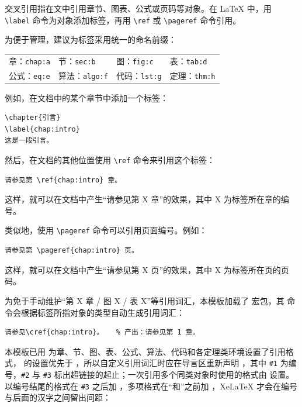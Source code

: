 交叉引用指在文中引用章节、图表、公式或页码等对象。在 \LaTeX{} 中，用 \verb|\label| 命令为对象添加标签，再用 \verb|\ref| 或 \verb|\pageref| 命令引用。

为便于管理，建议为标签采用统一的命名前缀：
\begin{center}
\begin{tabular*}{\linewidth}{@{\extracolsep{\fill}}llll}
  \toprule
  章：\verb|chap:a| & 节：\verb|sec:b| & 图：\verb|fig:c| & 表：\verb|tab:d| \\
  公式：\verb|eq:e| & 算法：\verb|algo:f| & 代码：\verb|lst:g| & 定理：\verb|thm:h| \\
  \bottomrule
\end{tabular*}
\end{center}

例如，在文档中的某个章节中添加一个标签：

\begin{Verbatim}
\chapter{引言}
\label{chap:intro}
这是一段引言。
\end{Verbatim}

然后，在文档的其他位置使用 \verb|\ref| 命令来引用这个标签：

\begin{Verbatim}
请参见第 \ref{chap:intro} 章。
\end{Verbatim}

这样，就可以在文档中产生“请参见第 X 章”的效果，其中 X 为标签所在章的编号。

类似地，使用 \verb|\pageref| 命令可以引用页面编号。例如：

\begin{Verbatim}
请参见第 \pageref{chap:intro} 页。
\end{Verbatim}

这样，就可以在文档中产生“请参见第 X 页”的效果，其中 X 为标签所在页的页码。

为免于手动维护“第 X 章 / 图 X / 表 X”等引用词汇，本模板加载了  宏包，其  命令会根据标签所指对象的类型自动生成引用词汇：

\begin{Verbatim}
请参见\cref{chap:intro}。   % 产出：请参见第 1 章。
\end{Verbatim}

本模板已用  为章、节、图、表、公式、算法、代码和各定理类环境设置了引用格式， 的设置优先于 ，所以自定义引用词汇时应在导言区重新声明 ，其中 \verb|#1| 为编号，\verb|#2| 与 \verb|#3| 标出超链接的起止；一次引用多个同类对象时使用的格式由  设置。以编号结尾的格式在 \verb|#3| 之后加 ，多项格式在“和”之前加 ，XeLaTeX 才会在编号与后面的汉字之间留出间距：

